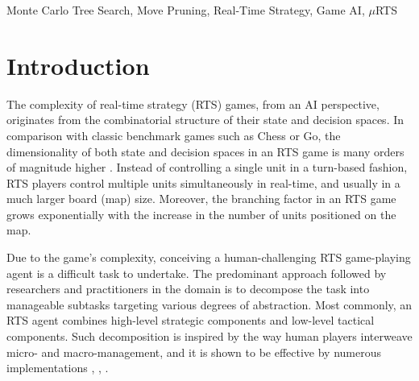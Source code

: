 \documentclass[conference]{IEEEtran}
\newcommand{\mRTS}{$\mu$RTS}
\begin{document}
\begin{abstract}
The impressive performance of Monte Carlo Tree Search (MCTS) based game-playing agents in high branching-factor domains such as Go, motivated researchers to apply and adapt MCTS to even more challenging domains. Real-time strategy (RTS) games feature a large combinatorial branching factor and a real-time aspect that pose significant challenges to a broad spectrum of AI techniques, including MCTS. Various MCTS enhancements were proposed, such as the combinatorial multi-armed bandit (CMAB) based sampling, state/action abstractions, and machine learning. In this paper, we propose to apply move pruning to MCTS-based agents, in the context of RTS games. We describe a class of possibly detrimental player-actions and elaborate several pruning approaches targeting this class. The experimentation results in \mRTS{} indicate that this could be a promising direction.
\end{abstract}

\begin{IEEEkeywords}
Monte Carlo Tree Search, Move Pruning, Real-Time Strategy, Game AI, \mRTS{}
\end{IEEEkeywords}



\section{Introduction}
\label{sec:introduction}

The complexity of real-time strategy (RTS) games, from an AI perspective, originates from the combinatorial structure of their state and decision spaces. In comparison with classic benchmark games such as Chess or Go, the dimensionality of both state and decision spaces in an RTS game is many orders of magnitude higher \cite{ontanon_survey_2013}. Instead of controlling a single unit in a turn-based fashion, RTS players control multiple units simultaneously in real-time, and usually in a much larger board (map) size. Moreover, the branching factor in an RTS game grows exponentially with the increase in the number of units positioned on the map.

Due to the game's complexity, conceiving a human-challenging RTS game-playing agent is a difficult task to undertake. The predominant approach followed by researchers and practitioners in the domain is to decompose the task into manageable subtasks targeting various degrees of abstraction. Most commonly, an RTS agent combines high-level strategic components and low-level tactical components. Such decomposition is inspired by the way human players interweave micro- and macro-management, and it is shown to be effective by numerous implementations \cite{barriga_combining_2017}, \cite{moraes_asymmetric_2018}, \cite{neufeld_hybrid_2019}. 
\end{document}
